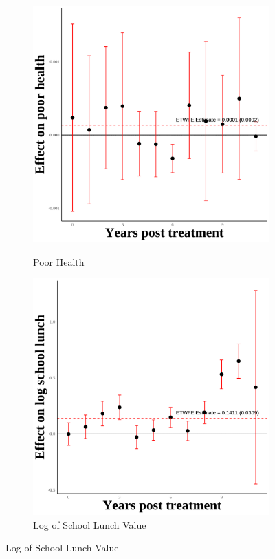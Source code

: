 \documentclass[12pt,english]{article}
\begin{document}
\pagebreak

\begin{figure}[H]
  \caption{Effect of Immigration Enforcement on Fourth Generation+ Outcomes}
  \centering

  \begin{subfigure}[b]{0.3\textwidth}
    \centering
    \caption{Poor Health}
    \includegraphics[width=\linewidth]{figures/plot89-poor_health_event_study-fourth.png}
    \label{fig:poor-health-fourth}
  \end{subfigure}
  \hfill
  \begin{subfigure}[b]{0.3\textwidth}
    \centering
    \caption{Log of School Lunch Value}
    \includegraphics[width=\linewidth]{figures/plot90-ln_schl_lunch_event_study-fourth.png}

\end{subfigure}
\end{figure}
\end{document}

